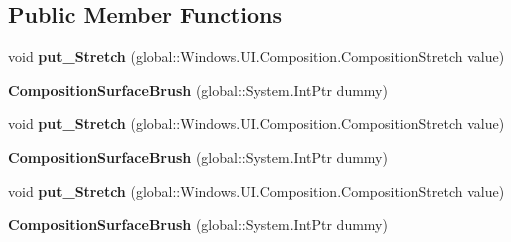 \subsection*{Public Member Functions}
\begin{DoxyCompactItemize}
\item 
\mbox{\label{class_windows_1_1_u_i_1_1_composition_1_1_composition_surface_brush_a08436b33baca073b40b83f22a2efb8ba}} 
void {\bfseries put\+\_\+\+Stretch} (global\+::\+Windows.\+U\+I.\+Composition.\+Composition\+Stretch value)
\item 
\mbox{\label{class_windows_1_1_u_i_1_1_composition_1_1_composition_surface_brush_adde61de5cb5dff361707cd04248ed784}} 
{\bfseries Composition\+Surface\+Brush} (global\+::\+System.\+Int\+Ptr dummy)
\item 
\mbox{\label{class_windows_1_1_u_i_1_1_composition_1_1_composition_surface_brush_a08436b33baca073b40b83f22a2efb8ba}} 
void {\bfseries put\+\_\+\+Stretch} (global\+::\+Windows.\+U\+I.\+Composition.\+Composition\+Stretch value)
\item 
\mbox{\label{class_windows_1_1_u_i_1_1_composition_1_1_composition_surface_brush_adde61de5cb5dff361707cd04248ed784}} 
{\bfseries Composition\+Surface\+Brush} (global\+::\+System.\+Int\+Ptr dummy)
\item 
\mbox{\label{class_windows_1_1_u_i_1_1_composition_1_1_composition_surface_brush_a08436b33baca073b40b83f22a2efb8ba}} 
void {\bfseries put\+\_\+\+Stretch} (global\+::\+Windows.\+U\+I.\+Composition.\+Composition\+Stretch value)
\item 
\mbox{\label{class_windows_1_1_u_i_1_1_composition_1_1_composition_surface_brush_adde61de5cb5dff361707cd04248ed784}} 
{\bfseries Composition\+Surface\+Brush} (global\+::\+System.\+Int\+Ptr dummy)
\item 
\mbox{\label{class_windows_1_1_u_i_1_1_composition_1_1_composition_surface_brush_a08436b33baca073b40b83f22a2efb8ba}} 

\end{DoxyCompactItemize}

